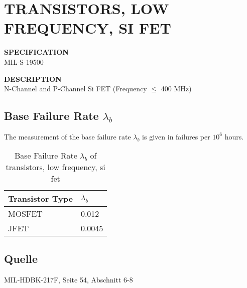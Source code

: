 \section{TRANSISTORS, LOW FREQUENCY, SI FET}

\begin{minipage}[t]{0.29\textwidth}
    \textbf{SPECIFICATION}\\
    MIL-S-19500
\end{minipage}
\begin{minipage}[t]{0.7\textwidth}
    \textbf{DESCRIPTION}\\
    {\fontsize{12pt}{12pt}\selectfont N-Channel and P-Channel Si FET (Frequency $\le$ 400 MHz) }
\end{minipage}

\subsection{Base Failure Rate $\lambda_b$}
The measurement of the base failure rate $\lambda_b$ is given in failures per $10^6$ hours.
\begin{table}[ht]
{\centering

\begin{tabular}{|p{7.5cm}|p{5cm}|}
    \hline
    \textbf{Transistor Type} & \textbf{$\lambda_b$} \\
    \hline
    MOSFET & 0.012 \\
    \hline
    JFET & 0.0045 \\
    \hline
\end{tabular}

\caption{Base Failure Rate $\lambda_b$ of transistors, low frequency, si fet}

\label{tab:bfr_transistors_low_frequency_si_fet}
\par}
\subsection*{Quelle}
MIL-HDBK-217F, Seite 54, Abschnitt 6-8
\end{table}